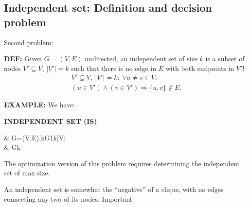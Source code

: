 \subsection{Independent set: Definition and decision problem}
Second problem:

\begin{notesdefinition}
\textbf{DEF:} Given $G=(V,E)$ undirected, an independent set of size $k$ is a subset of nodes $V'\subseteq V$, $|V'|=k$ such that there is no edge in $E$ with both endpoints in $V'$!
\[
\begin{gathered}
V'\subseteq V,\ |V'|=k:\ \forall u\neq v\in V:\\
(u\in V')\land(v\in V')\Rightarrow\{u,v\}\notin E.
\end{gathered}
\]
\end{notesdefinition}

\textbf{EXAMPLE:}
We have:

\textbf{INDEPENDENT SET (IS)}

\begin{notesproblem}
 & \langle G=(V,E),k\rangle\text{, }G1\leq k\leq|V|\\
 & Gk
\end{notesproblem}

The optimization version of this problem requires determining the independent set of max size.

An independent set is somewhat the ``negative'' of a clique, with no edges connecting any two of its nodes. Important
